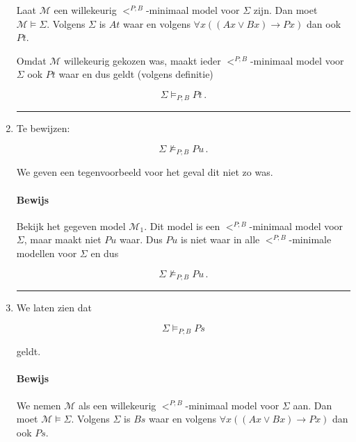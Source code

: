 \documentclass[a4paper,11pt]{article}
\begin{document}
\begin{enumerate}
Laat $\mathcal{M}$ een willekeurig $<^{P;B}$-minimaal model voor $\Sigma$
zijn. Dan moet $\mathcal{M} \vDash \Sigma$.  Volgens $\Sigma$ is $At$ waar en
volgens $\forall x ((Ax \vee Bx) \rightarrow Px)$  dan ook $Pt$.

Omdat $\mathcal{M}$ willekeurig gekozen was, maakt ieder
$<^{P;B}$-minimaal model voor $\Sigma$ ook $Pt$ waar en dus geldt (volgens
definitie)

\begin{displaymath}
\Sigma \vDash_{P;B} Pt \, \mbox{.}
\end{displaymath}

\hfill\rule{2.1mm}{2.mm}


\item

Te bewijzen:

\begin{displaymath}
\Sigma \nvDash_{P;B} Pu \, \mbox{.}
\end{displaymath}

We geven een tegenvoorbeeld voor het geval dit niet zo was.

\paragraph{Bewijs}

Bekijk het gegeven model $\mathcal{M}_{1}$. Dit model is een
$<^{P;B}$-minimaal model voor $\Sigma$, maar maakt niet $Pu$ waar. Dus $Pu$ is
niet waar in alle $<^{P;B}$-minimale modellen voor $\Sigma$ en dus

\begin{displaymath}
\Sigma \nvDash_{P;B} Pu \, \mbox{.}
\end{displaymath}

\hfill\rule{2.1mm}{2.mm}


\item

We laten zien dat

\begin{displaymath}
\Sigma \vDash_{P;B} Ps
\end{displaymath}

geldt.

\paragraph{Bewijs}

We nemen $\mathcal{M}$ als een willekeurig $<^{P;B}$-minimaal model voor
$\Sigma$ aan. Dan moet $\mathcal{M} \vDash \Sigma$.  Volgens $\Sigma$ is $Bs$
waar en volgens $\forall x ((Ax \vee Bx) \rightarrow Px)$  dan ook $Ps$.


\end{enumerate}
\end{document}
